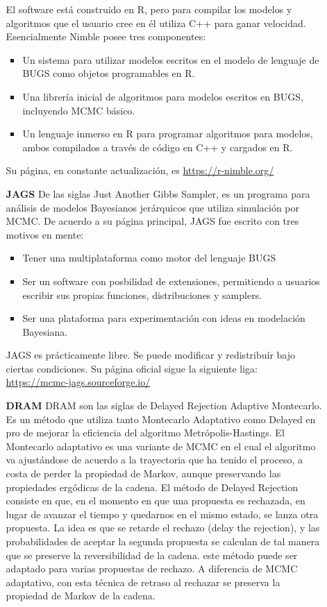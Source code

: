 \documentclass[letterpaper]{article}
\newcommand{\1}{\mathds{1}}
\theoremstyle{definition}
\theoremstyle{definition}
\theoremstyle{definition}
\theoremstyle{definition}
\theoremstyle{definition}
\begin{document}
\begin{itemize}
\begin{enumerate}
        El software está construido en R, pero para compilar los modelos y algoritmos que 
        el usuario cree en él utiliza C++ para ganar velocidad. Esencialmente Nimble posee tres componentes:
        \begin{itemize}
            \item Un sistema para utilizar modelos escritos en el modelo de lenguaje de BUGS como 
            objetos programables en R.
            \item Una librería inicial de algoritmos para modelos escritos en BUGS, incluyendo MCMC básico.
            \item Un lenguaje inmerso en R para programar algoritmos para modelos, ambos compilados a través 
            de código en C++ y cargados en R.
        \end{itemize}
        Su página, en constante actualización, es \url{https://r-nimble.org/}

        \item[\textbf{JAGS}] De las siglas Just Another Gibbs Sampler, es un programa para análisis de modelos Bayesianos jerárquicos
        que utiliza simulación por MCMC. De acuerdo a su página principal, JAGS fue escrito con tres motivos en mente:
        \begin{itemize}
            \item Tener una multiplataforma como motor del lenguaje BUGS
            \item Ser un software con posbilidad de extensiones, permitiendo a usuarios escribir sus propias funciones, distribuciones y samplers.
            \item Ser una plataforma para experimentación con ideas en modelación Bayesiana.
        \end{itemize}
        JAGS es prácticamente libre. Se puede modificar y redistribuír bajo ciertas condiciones. Su página 
        oficial sigue la siguiente liga: \url{https://mcmc-jags.sourceforge.io/}

        \item[\textbf{DRAM}] DRAM son las siglas de Delayed Rejection Adaptive Montecarlo. Es un método que utiliza tanto Montecarlo Adaptativo como Delayed  
        en pro de mejorar la eficiencia del algoritmo Metrópolis-Hastings. El Montecarlo adaptativo es una variante de MCMC en el cual el algoritmo va 
        ajustándose de acuerdo a la trayectoria que ha tenido el proceso, a costa de perder la propiedad de Markov, aunque preservando las propiedades 
        ergódicas de la cadena. El método de Delayed Rejection consiste en que, en el momento en que una propuesta es rechazada, en lugar de avanzar el tiempo y quedarnos en el 
        mismo estado, se lanza otra propuesta. La idea es que se retarde el rechazo (delay the rejection), y las probabilidades de aceptar la segunda propuesta se 
        calculan de tal manera que se preserve la reversibilidad de la cadena. este método puede ser adaptado para varias propuestas de rechazo. A diferencia de MCMC adaptativo, 
        con esta técnica de retraso al rechazar se preserva la propiedad de Markov de la cadena.\\


\end{enumerate}
\end{itemize}
\end{document}
